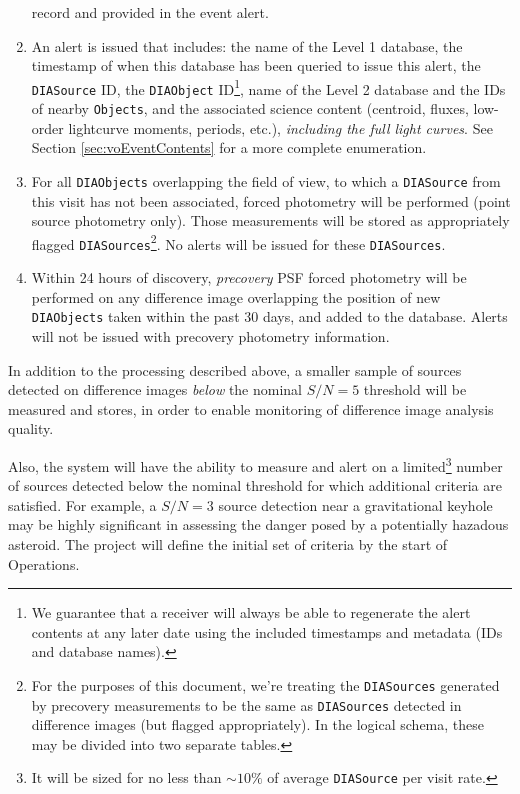 \documentclass[12pt]{article}
\newcommand{\code}[1]{\texttt{#1}}
\newcommand{\DIASource}{\code{DIASource}\xspace}
\newcommand{\DIASources}{\code{DIASources}\xspace}
\newcommand{\DIAObject}{\code{DIAObject}\xspace}
\newcommand{\DIAObjects}{\code{DIAObjects}\xspace}
\newcommand{\DB}{{Level 1 database}\xspace}
\newcommand{\DR}{{Level 2 database}\xspace}
\newcommand{\Objects}{\code{Objects}\xspace}
\begin{document}
\begin{enumerate}
      record and provided in the event alert.
\item An alert is issued that includes: the name of the \DB, the timestamp of
      when this database has been queried to issue this alert, the \DIASource
      ID, the \DIAObject ID\footnote{We guarantee that a receiver will always
      be able to regenerate the alert contents at any later date using the
      included timestamps and metadata (IDs and database names).}, name of the
      \DR and the IDs of nearby \Objects, and the associated science content
      (centroid, fluxes, low-order lightcurve moments, periods, etc.), {\em
      including the full light curves}. See Section \ref{sec:voEventContents}
      for a more complete enumeration.
\item For all \DIAObjects overlapping the field of view, to which a \DIASource
      from this visit has not been associated, forced photometry will be
      performed (point source photometry only). Those measurements will be
      stored as appropriately flagged \DIASources\footnote{For the purposes of
      this document, we're treating the \DIASources generated by precovery
      measurements to be the same as \DIASources detected in difference images
      (but flagged appropriately). In the logical schema, these may be divided
      into two separate tables.}. No alerts will be issued for these
      \DIASources.
\item Within 24 hours of discovery, {\em precovery} PSF forced photometry will
      be performed on any difference image overlapping the position of new
      \DIAObjects taken within the past 30 days, and added to the database.
      Alerts will not be issued with precovery photometry information.

\end{enumerate}

In addition to the processing described above, a smaller sample of sources
detected on difference images {\em below} the nominal $S/N=5$ threshold will
be measured and stores, in order to enable monitoring of difference image
analysis quality.

Also, the system will have the ability to measure and alert on a
limited\footnote{It will be sized for no less than $\sim 10\%$ of average
\DIASource per visit rate.} number of sources detected below the nominal
threshold for which additional criteria are satisfied. For example, a $S/N =
3$ source detection near a gravitational keyhole may be highly significant in
assessing the danger posed by a potentially hazadous asteroid. The project
will define the initial set of criteria by the start of Operations.
\end{document}
